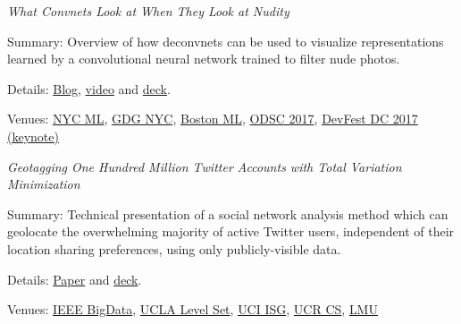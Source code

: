 \documentclass[margin,line]{res}
\newenvironment{list1}{
  \begin{list}{\ding{113}}{%
      \setlength{\itemsep}{0.0in}
      \setlength{\parsep}{0in} \setlength{\parskip}{0in}
      \setlength{\topsep}{0in} \setlength{\partopsep}{0in}
      \setlength{\leftmargin}{0.17in}}}{\end{list}}
\begin{document}
\begin{resume}
{\it What Convnets Look at When They Look at Nudity}
\begin{list1}
\item [] Summary: Overview of how deconvnets can be used to visualize representations learned by a convolutional neural network trained to filter nude photos.
\item [] Details: \href{http://blog.clarifai.com/what-convolutional-neural-networks-see-at-when-they-see-nudity/}{Blog}, \href{https://www.youtube.com/watch?v=dWgXPKMvxDg}{video} and \href{https://docs.google.com/presentation/d/14SNvMFqyqd3qlKvibc06GkB1lLmDutzcr04uJ_LnX4s/edit#slide=id.g1525123836_1_870}{deck}.
\item [] Venues: \href{https://www.meetup.com/NYC-Machine-Learning/events/235535192/}{NYC ML}, \href{https://www.meetup.com/gdgnyc/events/231372185/}{GDG NYC}, \href{https://www.meetup.com/bostonml/events/235419742/}{Boston ML}, \href{https://www.odsc.com/training/portfolio/convolutional-neural-networks-look-look-nudity}{ODSC 2017}, \href{http://www.devfestdc.org/speakers/ryan-compton/}{DevFest DC 2017 (keynote)}
\end{list1}

{\it Geotagging One Hundred Million Twitter Accounts with Total Variation Minimization}
\begin{list1}
\item [] Summary: Technical presentation of a social network analysis method which can geolocate the overwhelming majority of active Twitter users, independent of their location sharing preferences, using only publicly-visible data.
\item [] Details: \href{https://arxiv.org/abs/1404.7152}{Paper} and \href{http://ryancompton.net/assets/resume/geolocation_slides_2.pdf}{deck}.
\item [] Venues: \href{http://cci.drexel.edu/bigdata/bigdata2014/}{IEEE BigData}, \href{http://papyrus.math.ucla.edu/seminars/display.php?&id=831425}{UCLA Level Set}, \href{http://calendar.ics.uci.edu/event.php?calendar=1&category=&event=1386&date=2015-01-16}{UCI ISG}, \href{http://wwwcontent.cs.ucr.edu/department/eventlookup/491}{UCR CS}, \href{http://myweb.lmu.edu/yma/LMUMathSeminar.htm}{LMU}
\end{list1}


\end{resume}
\end{document}
